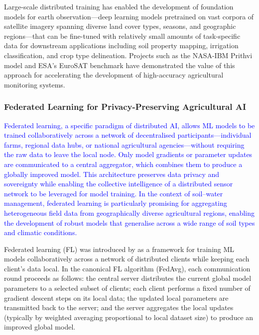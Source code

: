 \documentclass[land,article,submit,pdftex,moreauthors]{Definitions/mdpi}
\numberwithin{equation}{section}
\begin{document}
Large-scale distributed training has enabled the development of foundation models for earth observation---deep learning models pretrained on vast corpora of satellite imagery spanning diverse land cover types, seasons, and geographic regions---that can be fine-tuned with relatively small amounts of task-specific data for downstream applications including soil property mapping, irrigation classification, and crop type delineation. Projects such as the NASA-IBM Prithvi model and ESA's EuroSAT benchmark have demonstrated the value of this approach for accelerating the development of high-accuracy agricultural monitoring systems.

\subsubsection{Federated Learning for Privacy-Preserving Agricultural AI}

\textcolor{blue}{Federated learning, a specific paradigm of distributed AI, allows ML models to be trained collaboratively across a network of decentralised participants---individual farms, regional data hubs, or national agricultural agencies---without requiring the raw data to leave the local node. Only model gradients or parameter updates are communicated to a central aggregator, which combines them to produce a globally improved model. This architecture preserves data privacy and sovereignty while enabling the collective intelligence of a distributed sensor network to be leveraged for model training. In the context of soil--water management, federated learning is particularly promising for aggregating heterogeneous field data from geographically diverse agricultural regions, enabling the development of robust models that generalise across a wide range of soil types and climatic conditions.}

Federated learning (FL) was introduced by \citet{mcmahan2017communication} as a framework for training ML models collaboratively across a network of distributed clients while keeping each client's data local. In the canonical FL algorithm (FedAvg), each communication round proceeds as follows: the central server distributes the current global model parameters to a selected subset of clients; each client performs a fixed number of gradient descent steps on its local data; the updated local parameters are transmitted back to the server; and the server aggregates the local updates (typically by weighted averaging proportional to local dataset size) to produce an improved global model.
\end{document}
